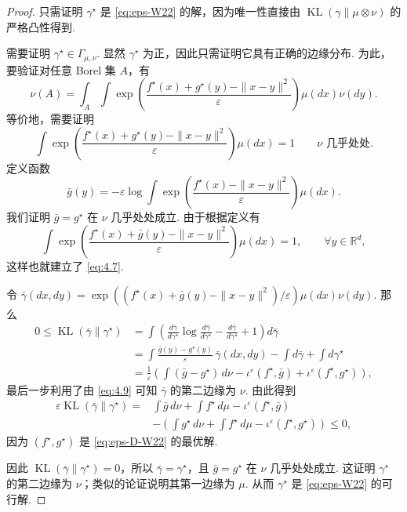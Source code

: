 \begin{proof}
只需证明 $\gamma^\star$ 是 \eqref{eq:eps-W22} 的解，因为唯一性直接由 $\operatorname{KL}(\gamma\|\mu\otimes\nu)$ 的严格凸性得到.

需要证明 $\gamma^\star\in\Gamma_{\mu,\nu}$. 显然 $\gamma^\star$ 为正，因此只需证明它具有正确的边缘分布. 为此，要验证对任意 Borel 集 $A$，有
$$\nu(A)=\int_A\int\exp\left(\frac{f^\star(x)+g^\star(y)-\|x-y\|^2}{\varepsilon}\right)\mu(dx)\nu(dy).$$
等价地，需要证明
\begin{equation}\label{eq:4.7}
\int\exp\left(\frac{f^\star(x)+g^\star(y)-\|x-y\|^2}{\varepsilon}\right)\mu(dx)=1
\qquad\nu\text{ 几乎处处}.
\end{equation}
定义函数
\begin{equation}\label{eq:4.8}
\bar g(y)=-\varepsilon\log\int\exp\left(\frac{f^\star(x)-\|x-y\|^2}{\varepsilon}\right)\mu(dx).
\end{equation}
我们证明 $\bar g=g^\star$ 在 $\nu$ 几乎处处成立. 由于根据定义有
\begin{equation}\label{eq:4.9}
\int\exp\left(\frac{f^\star(x)+\bar g(y)-\|x-y\|^2}{\varepsilon}\right)\mu(dx)=1,
\qquad\forall y\in\mathbb R^d,
\end{equation}
这样也就建立了 \eqref{eq:4.7}.

令 $\bar\gamma(dx,dy)=\exp((f^\star(x)+\bar g(y)-\|x-y\|^2)/\varepsilon)\mu(dx)\nu(dy)$. 那么
$$\begin{aligned}
0\le\operatorname{KL}(\bar\gamma\|\gamma^\star)
&=\int\left(\frac{d\bar\gamma}{d\gamma^\star}\log\frac{d\bar\gamma}{d\gamma^\star}
-\frac{d\bar\gamma}{d\gamma^\star}+1\right)d\bar\gamma\\
&=\int\frac{\bar g(y)-g^\star(y)}{\varepsilon}\,\bar\gamma(dx,dy)
-\int d\bar\gamma+\int d\gamma^\star\\
&=\frac1\varepsilon\left(\int(\bar g-g^\star)\,d\nu
-\iota^\varepsilon(f^\star,\bar g)+\iota^\varepsilon(f^\star,g^\star)\right),
\end{aligned}$$
最后一步利用了由 \eqref{eq:4.9} 可知 $\bar\gamma$ 的第二边缘为 $\nu$. 由此得到
$$\begin{aligned}
\varepsilon\operatorname{KL}(\bar\gamma\|\gamma^\star)
={}&\int\bar g\,d\nu+\int f^\star\,d\mu-\iota^\varepsilon(f^\star,\bar g)\\
&-\left(\int g^\star\,d\nu+\int f^\star\,d\mu-\iota^\varepsilon(f^\star,g^\star)\right)\le0,
\end{aligned}$$
因为 $(f^\star,g^\star)$ 是 \eqref{eq:eps-D-W22} 的最优解.

因此 $\operatorname{KL}(\bar\gamma\|\gamma^\star)=0$，所以 $\bar\gamma=\gamma^\star$，且 $\bar g=g^\star$ 在 $\nu$ 几乎处处成立. 这证明 $\gamma^\star$ 的第二边缘为 $\nu$；类似的论证说明其第一边缘为 $\mu$. 从而 $\gamma^\star$ 是 \eqref{eq:eps-W22} 的可行解.


\end{proof}

